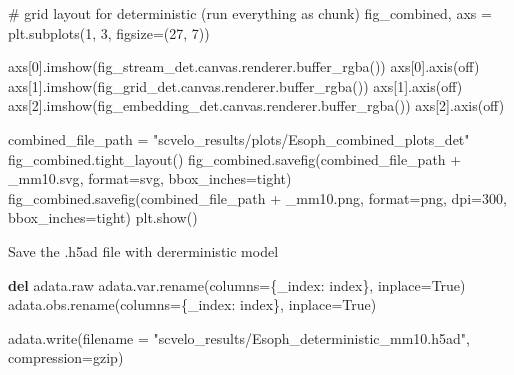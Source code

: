 \documentclass[
  letterpaper,
  DIV=11,
  numbers=noendperiod]{scrreprt}
\newenvironment{Shaded}{\begin{snugshade}}{\end{snugshade}}
\newcommand{\BuiltInTok}[1]{\textcolor[rgb]{0.00,0.23,0.31}{#1}}
\newcommand{\CommentTok}[1]{\textcolor[rgb]{0.37,0.37,0.37}{#1}}
\newcommand{\DecValTok}[1]{\textcolor[rgb]{0.68,0.00,0.00}{#1}}
\newcommand{\KeywordTok}[1]{\textcolor[rgb]{0.00,0.23,0.31}{\textbf{#1}}}
\newcommand{\NormalTok}[1]{\textcolor[rgb]{0.00,0.23,0.31}{#1}}
\newcommand{\OperatorTok}[1]{\textcolor[rgb]{0.37,0.37,0.37}{#1}}
\newcommand{\StringTok}[1]{\textcolor[rgb]{0.13,0.47,0.30}{#1}}
\newcommand{\VariableTok}[1]{\textcolor[rgb]{0.07,0.07,0.07}{#1}}
\begin{document}
\begin{Shaded}
\begin{Highlighting}[]
\CommentTok{\# grid layout for deterministic (run everything as chunk)}
\NormalTok{fig\_combined, axs }\OperatorTok{=}\NormalTok{ plt.subplots(}\DecValTok{1}\NormalTok{, }\DecValTok{3}\NormalTok{, figsize}\OperatorTok{=}\NormalTok{(}\DecValTok{27}\NormalTok{, }\DecValTok{7}\NormalTok{))}

\NormalTok{axs[}\DecValTok{0}\NormalTok{].imshow(fig\_stream\_det.canvas.renderer.buffer\_rgba())}
\NormalTok{axs[}\DecValTok{0}\NormalTok{].axis(}\StringTok{\textquotesingle{}off\textquotesingle{}}\NormalTok{)}
\NormalTok{axs[}\DecValTok{1}\NormalTok{].imshow(fig\_grid\_det.canvas.renderer.buffer\_rgba())}
\NormalTok{axs[}\DecValTok{1}\NormalTok{].axis(}\StringTok{\textquotesingle{}off\textquotesingle{}}\NormalTok{)}
\NormalTok{axs[}\DecValTok{2}\NormalTok{].imshow(fig\_embedding\_det.canvas.renderer.buffer\_rgba())}
\NormalTok{axs[}\DecValTok{2}\NormalTok{].axis(}\StringTok{\textquotesingle{}off\textquotesingle{}}\NormalTok{) }

\NormalTok{combined\_file\_path }\OperatorTok{=} \StringTok{"scvelo\_results/plots/Esoph\_combined\_plots\_det"}
\NormalTok{fig\_combined.tight\_layout()}
\NormalTok{fig\_combined.savefig(combined\_file\_path }\OperatorTok{+} \StringTok{\textquotesingle{}\_mm10.svg\textquotesingle{}}\NormalTok{, }\BuiltInTok{format}\OperatorTok{=}\StringTok{\textquotesingle{}svg\textquotesingle{}}\NormalTok{, bbox\_inches}\OperatorTok{=}\StringTok{\textquotesingle{}tight\textquotesingle{}}\NormalTok{)}
\NormalTok{fig\_combined.savefig(combined\_file\_path }\OperatorTok{+} \StringTok{\textquotesingle{}\_mm10.png\textquotesingle{}}\NormalTok{, }\BuiltInTok{format}\OperatorTok{=}\StringTok{\textquotesingle{}png\textquotesingle{}}\NormalTok{, dpi}\OperatorTok{=}\DecValTok{300}\NormalTok{, bbox\_inches}\OperatorTok{=}\StringTok{\textquotesingle{}tight\textquotesingle{}}\NormalTok{)}
\NormalTok{plt.show()}
\end{Highlighting}
\end{Shaded}

Save the .h5ad file with dererministic model

\begin{Shaded}
\begin{Highlighting}[]
\KeywordTok{del}\NormalTok{ adata.raw}
\NormalTok{adata.var.rename(columns}\OperatorTok{=}\NormalTok{\{}\StringTok{\textquotesingle{}\_index\textquotesingle{}}\NormalTok{: }\StringTok{\textquotesingle{}index\textquotesingle{}}\NormalTok{\}, inplace}\OperatorTok{=}\VariableTok{True}\NormalTok{)}
\NormalTok{adata.obs.rename(columns}\OperatorTok{=}\NormalTok{\{}\StringTok{\textquotesingle{}\_index\textquotesingle{}}\NormalTok{: }\StringTok{\textquotesingle{}index\textquotesingle{}}\NormalTok{\}, inplace}\OperatorTok{=}\VariableTok{True}\NormalTok{)}

\NormalTok{adata.write(filename }\OperatorTok{=} \StringTok{"scvelo\_results/Esoph\_deterministic\_mm10.h5ad"}\NormalTok{, compression}\OperatorTok{=}\StringTok{\textquotesingle{}gzip\textquotesingle{}}\NormalTok{)}
\end{Highlighting}
\end{Shaded}
\end{document}
